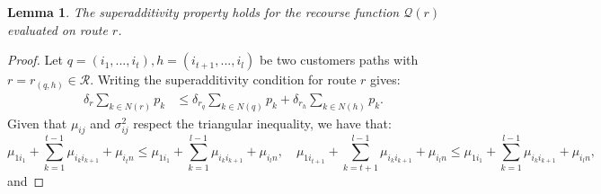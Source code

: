 \documentclass[11pt]{article}
\newtheorem{lemma}[theorem]{Lemma}
\theoremstyle{definition}
\newtheorem{definition}{Definition}[section]
\begin{document}

\begin{lemma}
  \label{lem:superadditivity}
  The superadditivity property holds for the recourse function $\mathcal{Q}(r)$ evaluated on route $r$.
\end{lemma}

\begin{proof}
  Let $q=(i_1,...,i_t), h=(i_{t+1},...,i_l)$ be two customers paths with $r = r_{(q, h)} \in \mathcal{R}$. Writing the superadditivity condition for route $r$ gives:
  \begin{align}
  \delta_r \sum_{k \in N(r)}p_k & \leq \delta_{r_q} \sum_{k \in N(q)}p_k + \delta_{r_h} \sum_{k \in N(h)}p_k.
  \label{eq:superadditivity}
  \end{align}
  Given that $\mu_{ij}$ and $\sigma^2_{ij}$ respect the triangular inequality, we have that:
  \begin{equation*}
  \mu_{1i_1} + \sum_{k=1}^{t-1} \mu_{i_k i_{k+1}} + \mu_{i_t n} \leq \mu_{1i_1} + \sum_{k=1}^{l-1} \mu_{i_k i_{k+1}} + \mu_{i_l n}, \quad \mu_{1i_{t+1}} + \sum_{k=t+1}^{l-1} \mu_{i_k i_{k+1}} + \mu_{i_l n} \leq \mu_{1i_1} + \sum_{k=1}^{l-1} \mu_{i_k i_{k+1}} + \mu_{i_l n},
  \end{equation*}
  and

\end{proof}
\end{document}
